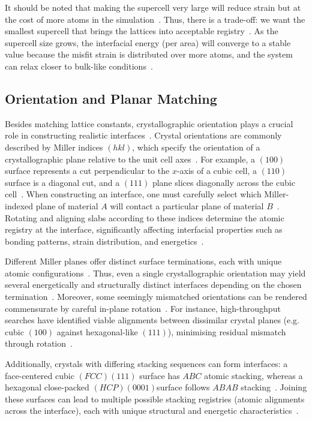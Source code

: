 It should be noted that making the supercell very large will reduce strain but at the cost of more atoms in the simulation~\nocite{}.
Thus, there is a trade-off: we want the smallest supercell that brings the lattices into acceptable registry~\nocite{}.
As the supercell size grows, the interfacial energy (per area) will converge to a stable value because the misfit strain is distributed over more atoms, and the system can relax closer to bulk-like conditions~\nocite{}.

\subsection*{Orientation and Planar Matching}\label{sec:orientation_matching}

Besides matching lattice constants, crystallographic orientation plays a crucial role in constructing realistic interfaces~\nocite{}.
Crystal orientations are commonly described by Miller indices $(hkl)$, which specify the orientation of a crystallographic plane relative to the unit cell axes~\nocite{}.
For example, a $(100)$ surface represents a cut perpendicular to the $x$-axis of a cubic cell, a $(110)$ surface is a diagonal cut, and a $(111)$ plane slices diagonally across the cubic cell~\nocite{}.
When constructing an interface, one must carefully select which Miller-indexed plane of material $A$ will contact a particular plane of material $B$~\nocite{}.
Rotating and aligning slabs according to these indices determine the atomic registry at the interface, significantly affecting interfacial properties such as bonding patterns, strain distribution, and energetics~\cite{artemis_paper}.

Different Miller planes offer distinct surface terminations, each with unique atomic configurations~\nocite{}.
Thus, even a single crystallographic orientation may yield several energetically and structurally distinct interfaces depending on the chosen termination~\nocite{}.
Moreover, some seemingly mismatched orientations can be rendered commensurate by careful in-plane rotation~\nocite{}.
For instance, high-throughput searches have identified viable alignments between dissimilar crystal planes (e.g. cubic $(100)$ against hexagonal-like $(111)$), minimising residual mismatch through rotation~\nocite{}.

Additionally, crystals with differing stacking sequences can form interfaces: a face-centered cubic $(FCC) (111)$ surface has $ABC$ atomic stacking, whereas a hexagonal close-packed $(HCP) (0001) $surface follows $ABAB$ stacking~\nocite{}.
Joining these surfaces can lead to multiple possible stacking registries (atomic alignments across the interface), each with unique structural and energetic characteristics~\nocite{}.

